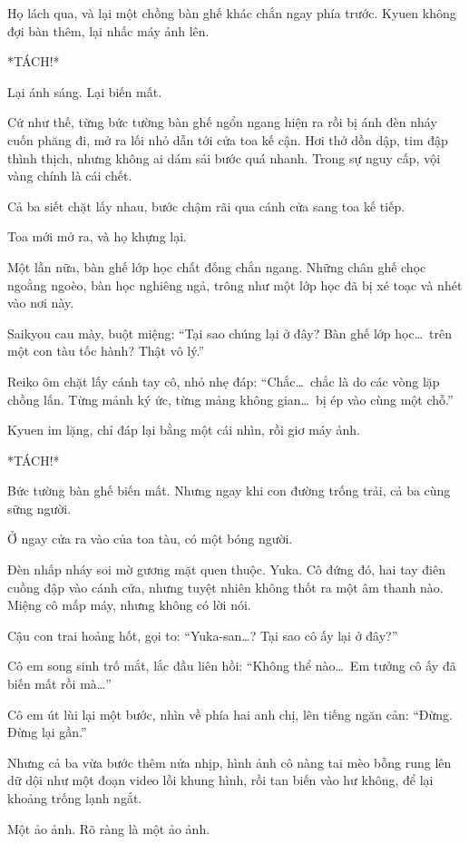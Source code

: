\documentclass[../main.tex]{subfiles}
\begin{document}
Họ lách qua, và lại một chồng bàn ghế khác chắn ngay phía trước. Kyuen không đợi bàn thêm, lại nhấc máy ảnh lên.

*TÁCH!*

Lại ánh sáng. Lại biến mất.

Cứ như thế, từng bức tường bàn ghế ngổn ngang hiện ra rồi bị ánh đèn nháy cuốn phăng đi, mở ra lối nhỏ dẫn tới cửa toa kế cận. Hơi thở dồn dập, tim đập thình thịch, nhưng không ai dám sải bước quá nhanh. Trong sự nguy cấp, vội vàng chính là cái chết.

Cả ba siết chặt lấy nhau, bước chậm rãi qua cánh cửa sang toa kế tiếp.

\ct

Toa mới mở ra, và họ khựng lại.

Một lần nữa, bàn ghế lớp học chất đống chắn ngang. Những chân ghế chọc ngoằng ngoèo, bàn học nghiêng ngả, trông như một lớp học đã bị xé toạc và nhét vào nơi này.

Saikyou cau mày, buột miệng: ``Tại sao chúng lại ở đây? Bàn ghế lớp học\dots\ trên một con tàu tốc hành? Thật vô lý.''

Reiko ôm chặt lấy cánh tay cô, nhỏ nhẹ đáp: ``Chắc\dots\ chắc là do các vòng lặp chồng lấn. Từng mảnh ký ức, từng mảng không gian\dots\ bị ép vào cùng một chỗ.''

Kyuen im lặng, chỉ đáp lại bằng một cái nhìn, rồi giơ máy ảnh.

*TÁCH!*

Bức tường bàn ghế biến mất. Nhưng ngay khi con đường trống trải, cả ba cùng sững người.

Ở ngay cửa ra vào của toa tàu, có một bóng người.

Đèn nhấp nháy soi mờ gương mặt quen thuộc. Yuka. Cô đứng đó, hai tay điên cuồng đập vào cánh cửa, nhưng tuyệt nhiên không thốt ra một âm thanh nào. Miệng cô mấp máy, nhưng không có lời nói.

Cậu con trai hoảng hốt, gọi to: ``Yuka-san\dots? Tại sao cô ấy lại ở đây?''

Cô em song sinh trố mắt, lắc đầu liên hồi: ``Không thể nào\dots\ Em tưởng cô ấy đã biến mất rồi mà\dots''

Cô em út lùi lại một bước, nhìn về phía hai anh chị, lên tiếng ngăn cản: ``Đừng. Đừng lại gần.''

Nhưng cả ba vừa bước thêm nửa nhịp, hình ảnh cô nàng tai mèo bỗng rung lên dữ dội như một đoạn video lỗi khung hình, rồi tan biến vào hư không, để lại khoảng trống lạnh ngắt.

Một ảo ảnh. Rõ ràng là một ảo ảnh.
\end{document}
